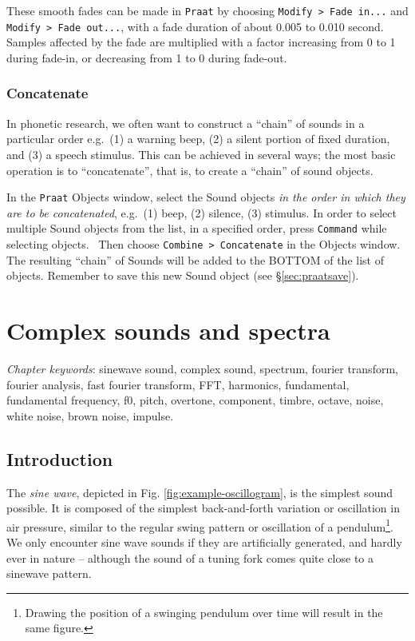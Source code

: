\documentclass[
]{book}
\begin{document}
\protect{}\label{box-praatfades}
These smooth fades can be made in \texttt{Praat} by choosing \texttt{Modify\ \textgreater{}\ Fade\ in...} and \texttt{Modify\ \textgreater{}\ Fade\ out...}, with a fade duration of about 0.005 to 0.010 second. Samples affected by the fade are multiplied with a factor increasing from 0 to 1 during fade-in, or decreasing from 1 to 0 during fade-out.

\subsection{Concatenate}\label{sec:concatenate}

In phonetic research, we often want to construct a ``chain'' of sounds in a particular order e.g.~(1) a warning beep, (2) a silent portion of fixed duration, and (3) a speech stimulus. This can be achieved in several ways; the most basic operation is to ``concatenate'', that is, to create a ``chain'' of sound objects.

\protect{}\label{box-praatconcatenate}
In the \texttt{Praat} Objects window, select the Sound objects \emph{in the order in which they are to be concatenated}, e.g.~(1) beep, (2) silence, (3) stimulus. In order to select multiple Sound objects from the list, in a specified order, press \texttt{Command} while selecting objects.~
Then choose \texttt{Combine\ \textgreater{}\ Concatenate} in the Objects window. The resulting ``chain'' of Sounds will be added to the BOTTOM of the list of objects. Remember to save this new Sound object (see §\ref{sec:praatsave}).

\chapter{Complex sounds and spectra}\label{complex-sounds-and-spectra}

\emph{Chapter keywords}: sinewave sound, complex sound, spectrum, fourier transform, fourier analysis, fast fourier transform, FFT, harmonics, fundamental, fundamental frequency, f0, pitch, overtone, component, timbre, octave, noise, white noise, brown noise, impulse.

\section{Introduction}\label{sec:FTintro}

The \emph{sine wave}, depicted in Fig. \ref{fig:example-oscillogram}, is the simplest sound possible. It is composed of the simplest back-and-forth variation or oscillation in air pressure, similar to the regular swing pattern or oscillation of a pendulum\footnote{Drawing the position of a swinging pendulum over time will result in the same figure.}. We only encounter sine wave sounds if they are artificially generated, and hardly ever in nature -- although the sound of a tuning fork comes quite close to a sinewave pattern.
\end{document}
